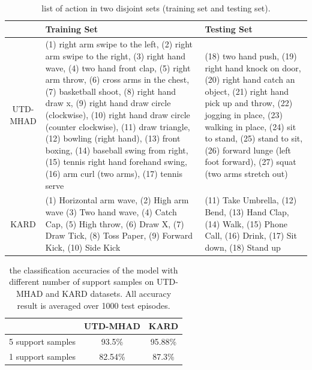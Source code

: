\documentclass{bmvc2k}
\begin{document}
\begin{table}[htb]
	\begin{center}
		\begin{tabular}{|c|p{4.8cm}|p{4cm}|}
			
			\hline
			& Training Set  & Testing Set \\
			\hline\hline
			UTD-MHAD & (1) right arm swipe to the left, (2) right arm swipe to the right, (3) right hand wave, (4) two hand front clap, (5) right arm throw, (6) cross arms in the chest, (7) basketball shoot, (8) right hand draw x, (9) right hand draw circle (clockwise), (10) right hand draw circle (counter clockwise), (11) draw triangle, (12) bowling (right hand), (13) front boxing, (14) baseball swing from right, (15) tennis right hand forehand swing, (16) arm curl (two arms), (17) tennis serve & (18) two hand push, (19) right hand knock on door, (20) right hand catch an object, (21) right hand pick up and throw, (22) jogging in place, (23) walking in place, (24) sit to stand, (25) stand to sit, (26) forward lunge (left foot forward), (27) squat (two arms stretch out)\\
			\hline
			KARD & (1) Horizontal arm wave, (2) High arm wave
			(3) Two hand wave, (4) Catch Cap, (5) High throw, (6) Draw X, (7) Draw Tick, (8) Toss Paper, (9) Forward Kick, (10) Side Kick
			& (11) Take Umbrella, (12) Bend, (13) Hand Clap, (14) Walk, (15) Phone Call, (16) Drink, (17) Sit down, (18) Stand up \\
			\hline
		\end{tabular}	
	\end{center}
	\caption{ list of action in two disjoint sets (training set and testing set). }	
	\label{tab:3}
\end{table}
\begin{table}[htbp]
	\begin{center}	
		\begin{tabular}{|c|c|c|}
			\hline
			& UTD-MHAD & KARD\\
			\hline\hline
			5 support samples & 93.5\% & 95.88\% \\
			1 support samples & 82.54\%
			& 87.3\%\\
			\hline
		\end{tabular}	
	\end{center}
	\caption{ the classification accuracies of the model with different number of support samples on UTD-MHAD and KARD datasets. All accuracy result is averaged over 1000 test episodes. }	
	\label{tab:4}
\end{table}
\end{document}
